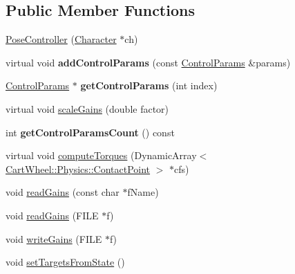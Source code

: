 \subsection*{Public Member Functions}
\begin{DoxyCompactItemize}
\item 
\hyperlink{classCartWheel_1_1Core_1_1PoseController_af6c78505668fd7101f9ce8d74637763b}{PoseController} (\hyperlink{classCartWheel_1_1Core_1_1Character}{Character} $\ast$ch)
\item 
\hypertarget{classCartWheel_1_1Core_1_1PoseController_ad4884fbd9b2758729e0b8dc481fbd7ea}{
virtual void {\bfseries addControlParams} (const \hyperlink{classCartWheel_1_1Core_1_1ControlParams}{ControlParams} \&params)}
\label{classCartWheel_1_1Core_1_1PoseController_ad4884fbd9b2758729e0b8dc481fbd7ea}

\item 
\hypertarget{classCartWheel_1_1Core_1_1PoseController_a8b371dedd146ebc70a15305e42199816}{
\hyperlink{classCartWheel_1_1Core_1_1ControlParams}{ControlParams} $\ast$ {\bfseries getControlParams} (int index)}
\label{classCartWheel_1_1Core_1_1PoseController_a8b371dedd146ebc70a15305e42199816}

\item 
virtual void \hyperlink{classCartWheel_1_1Core_1_1PoseController_a943dbb6a3cc2ea8c4897cb4979983cea}{scaleGains} (double factor)
\item 
\hypertarget{classCartWheel_1_1Core_1_1PoseController_adec071048442ffd4d0e0f1090eca667c}{
int {\bfseries getControlParamsCount} () const }
\label{classCartWheel_1_1Core_1_1PoseController_adec071048442ffd4d0e0f1090eca667c}

\item 
virtual void \hyperlink{classCartWheel_1_1Core_1_1PoseController_a48cf8c4a4ef762251f03a01ed8c24cd0}{computeTorques} (DynamicArray$<$ \hyperlink{classCartWheel_1_1Physics_1_1ContactPoint}{CartWheel::Physics::ContactPoint} $>$ $\ast$cfs)
\item 
void \hyperlink{classCartWheel_1_1Core_1_1PoseController_ae70268cf3e1ef0d0d1b0f9585b2221e3}{readGains} (const char $\ast$fName)
\item 
void \hyperlink{classCartWheel_1_1Core_1_1PoseController_a6070385fa69f77349735504fafcaae73}{readGains} (FILE $\ast$f)
\item 
void \hyperlink{classCartWheel_1_1Core_1_1PoseController_a4ab18da53609276376d80034f891cf46}{writeGains} (FILE $\ast$f)
\item 
void \hyperlink{classCartWheel_1_1Core_1_1PoseController_aba53f7222a9df8d1beec72536b711a81}{setTargetsFromState} ()
\end{DoxyCompactItemize}
